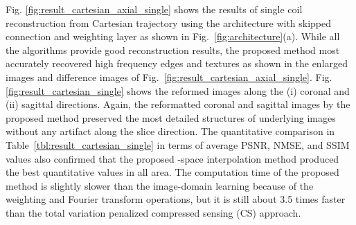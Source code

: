 \documentclass[10pt,journal]{IEEEtran}
\newcommand{\0}{{\boldsymbol{0}}}
\begin{document}
\begin{table*}[!t]
\centering
{}
\caption{Quantitative comparison from Cartesian trajectory at  in 8 coils parallel imaging. }
\label{tbl:result_cartesian_multi}
\end{table*}

 Fig. \ref{fig:result_cartesian_axial_single} shows the results of single coil reconstruction from Cartesian trajectory using the architecture with skipped connection and weighting layer as shown in Fig.~\ref{fig:architecture}(a).
 While all the algorithms provide good reconstruction results, the proposed method most accurately
recovered  high frequency edges and textures 
as shown in the enlarged images and difference images of Fig.~\ref{fig:result_cartesian_axial_single}.
Fig. \ref{fig:result_cartesian_single} shows the reformed images along the (i) coronal and (ii) sagittal directions. Again, the reformatted coronal and sagittal images by the proposed method
preserved the most detailed structures of underlying images without any artifact along the slice direction. 
 The quantitative comparison in Table~\ref{tbl:result_cartesian_single} in terms of   average PSNR, NMSE, and SSIM values also confirmed that
the proposed -space interpolation method produced the best quantitative values in all area. The computation time of the
proposed method is slightly slower than the image-domain learning because of the weighting and Fourier transform operations,
but it is still about 3.5 times faster than the total variation penalized compressed sensing (CS) approach.
\end{document}
